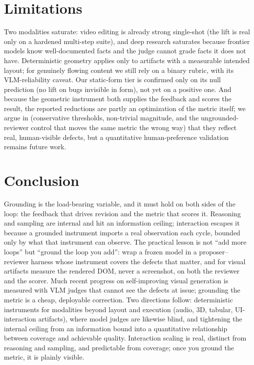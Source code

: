 \section{Limitations}
\label{sec:limitations}

Two modalities saturate: video editing is already strong single-shot (the lift is real only on a hardened multi-step suite), and deep research saturates because frontier models know well-documented facts and the judge cannot grade facts it does not have. Deterministic geometry applies only to artifacts with a measurable intended layout; for genuinely flowing content we still rely on a binary rubric, with its VLM-reliability caveat. Our static-form tier is confirmed only on its null prediction (no lift on bugs invisible in form), not yet on a positive one. And because the geometric instrument both supplies the feedback and scores the result, the reported reductions are partly an optimization of the metric itself; we argue in  (conservative thresholds, non-trivial magnitude, and the ungrounded-reviewer control that moves the same metric the wrong way) that they reflect real, human-visible defects, but a quantitative human-preference validation remains future work.

\section{Conclusion}
\label{sec:conclusion}

Grounding is the load-bearing variable, and it must hold on both sides of the loop: the feedback that drives revision and the metric that scores it. Reasoning and sampling are internal and hit an information ceiling; interaction escapes it because a grounded instrument imports a real observation each cycle, bounded only by what that instrument can observe. The practical lesson is not ``add more loops'' \citep{swyx2026loopcraft,langchain2026loopeng} but ``ground the loop you add'': wrap a frozen model in a proposer--reviewer harness whose instrument covers the defects that matter, and for visual artifacts measure the rendered DOM, never a screenshot, on both the reviewer and the scorer. Much recent progress on self-improving visual generation is measured with VLM judges that cannot see the defects at issue; grounding the metric is a cheap, deployable correction. Two directions follow: deterministic instruments for modalities beyond layout and execution (audio, 3D, tabular, UI-interaction artifacts), where model judges are likewise blind, and tightening the internal ceiling from an information bound into a quantitative relationship between coverage and achievable quality. Interaction scaling is real, distinct from reasoning and sampling, and predictable from coverage; once you ground the metric, it is plainly visible.
